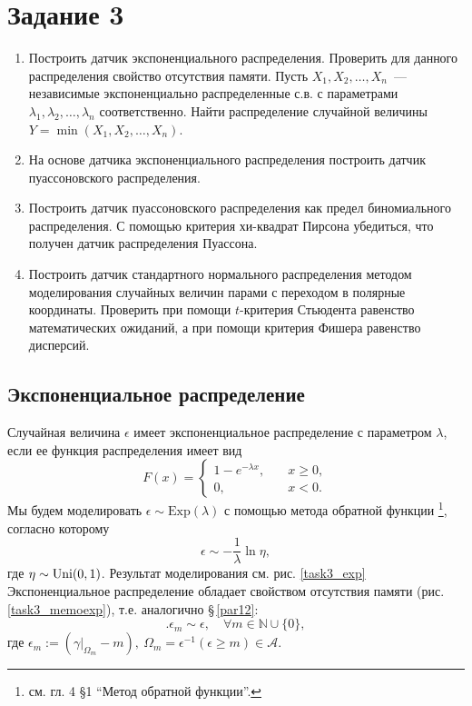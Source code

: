 \section{Задание 3}

\begin{enumerate}
	\item Построить датчик экспоненциального распределения. Проверить для 
    данного распределения свойство отсутствия памяти. Пусть 
    $X_1,X_2,\dots,X_n$~--- независимые экспоненциально распределенные с.в. с 
    параметрами $\lambda_1, \lambda_2, \dots, \lambda_n$ соответственно. Найти 
    распределение случайной величины $Y = \min(X_1, X_2, \dots, X_n)$.
	\item На основе датчика экспоненциального распределения построить датчик 
    пуассоновского распределения.
	\item Построить датчик пуассоновского распределения как предел биномиального
     распределения. С помощью критерия хи-квадрат Пирсона убедиться, что получен
     датчик распределения Пуассона.
	\item Построить датчик стандартного нормального распределения методом 
    моделирования случайных величин парами с переходом в полярные координаты. 
    Проверить при помощи $t$-критерия Стьюдента равенство математических 
    ожиданий, а при помощи критерия Фишера равенство дисперсий.  
\end{enumerate}

\subsection{Экспоненциальное распределение} \label{exp_section}
    Случайная величина $\epsilon$ имеет экспоненциальное распределение с 
    параметром $\lambda$, если ее функция распределения имеет вид
    \begin{equation}
        F(x) = \left\{  \begin{aligned}
            1 - e^{-\lambda x},&\quad x \ge 0,\\
            0,&\quad x < 0.
                        \end{aligned}\right.
    \end{equation}
    Мы будем моделировать $\epsilon \sim \mathrm{Exp}(\lambda)$ с помощью 
    метода обратной функции
    \footnote{см. \cite{NMS} гл. 4 \S 1 ``Метод обратной функции''.},
    согласно которому 
    \[\epsilon \sim -\frac{1}{\lambda} \ln\eta,\]
    где $\eta \sim \mathrm{Uni}(0,1)$.
    Результат моделирования см. рис. \ref{task3_exp}
    \newpage
    Экспоненциальное распределение обладает свойством отсутствия памяти 
    (рис. \ref{task3_memoexp}), т.е. аналогично \S\,\ref{par12}:
    \[\bigl. \epsilon_m \sim \epsilon ,\quad \forall{m} \in \mathbb{N} \cup \{0\},\]
    где $\epsilon_m := (\gamma \bigr|_{\Omega_m} - m),\: 
    \Omega_m = \epsilon^{-1}(\epsilon \geqslant m) \in \mathcal{A}.$ 
    \bigskip

